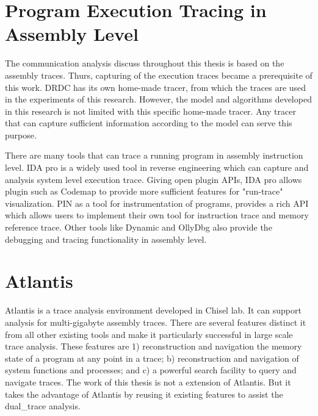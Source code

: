 \section{Program Execution Tracing in Assembly Level}
The communication analysis discuss throughout this thesis is based on the assembly traces. Thurs, capturing of the execution traces became a prerequisite of this work. DRDC has its own home-made tracer, from which the traces are used in the experiments of this research. However, the model and algorithms developed in this research is not limited with this specific home-made tracer. Any tracer that can capture sufficient information according to the model can serve this purpose.

There are many tools that can trace a running program in assembly instruction level.  IDA pro \cite{eagle_ida_2008} is a widely used tool in reverse engineering which can capture and analysis system level execution trace. Giving open plugin APIs, IDA pro allows plugin such as Codemap \cite{_c0demap/codemap:_????} to provide more sufficient features for "run-trace" visualization. PIN\cite{_pin_????} as a tool for instrumentation of programs, provides a rich API which allows users to implement their own tool for instruction trace and memory reference trace. Other tools like Dynamic \cite{brueningqz} and OllyDbg\cite{yuschuk2007ollydbg} also provide the debugging and tracing functionality in assembly level. 

\section{Atlantis}
Atlantis is a trace analysis environment developed in Chisel lab. It can support analysis for multi-gigabyte assembly traces. There are several features distinct it from all other existing tools and make it particularly successful in large scale trace analysis. These features are 1) reconstruction and navigation the memory state of a program at any point in a trace; b) reconstruction and navigation of system functions and processes; and c) a powerful search facility to query and navigate traces.\cite{huang2017atlantis} The work of this thesis is not a extension of Atlantis. But it takes the advantage of Atlantis by reusing it existing features to assist the dual\_trace analysis.




